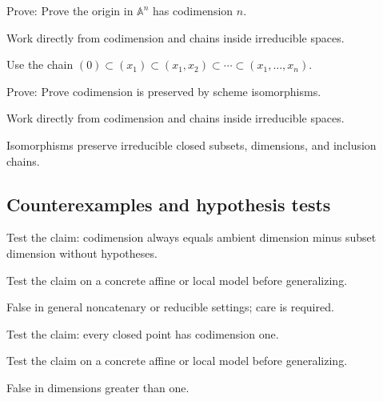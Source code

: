\begin{exercise}\label{exr:vi31-expand-08}
Prove: Prove the origin in $\mathbb A^n$ has codimension $n$.
\end{exercise}
\begin{hint}
Work directly from codimension and chains inside irreducible spaces.
\end{hint}
\begin{solution}
Use the chain $(0)\subset(x_1)\subset(x_1,x_2)\subset\cdots\subset(x_1,\ldots,x_n)$.
\end{solution}

\begin{exercise}\label{exr:vi31-expand-09}
Prove: Prove codimension is preserved by scheme isomorphisms.
\end{exercise}
\begin{hint}
Work directly from codimension and chains inside irreducible spaces.
\end{hint}
\begin{solution}
Isomorphisms preserve irreducible closed subsets, dimensions, and inclusion chains.
\end{solution}

\subsection*{Counterexamples and hypothesis tests}

\begin{exercise}\label{exr:vi31-expand-10}
Test the claim: codimension always equals ambient dimension minus subset dimension without hypotheses.
\end{exercise}
\begin{hint}
Test the claim on a concrete affine or local model before generalizing.
\end{hint}
\begin{solution}
False in general noncatenary or reducible settings; care is required.
\end{solution}

\begin{exercise}\label{exr:vi31-expand-11}
Test the claim: every closed point has codimension one.
\end{exercise}
\begin{hint}
Test the claim on a concrete affine or local model before generalizing.
\end{hint}
\begin{solution}
False in dimensions greater than one.
\end{solution}

